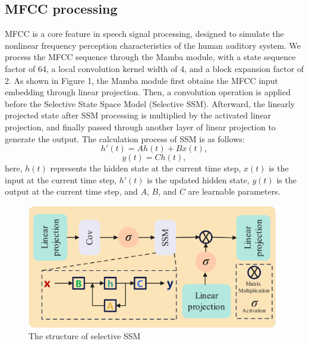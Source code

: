 \documentclass[runningheads]{llncs}
\begin{document}
\subsection{MFCC processing}

MFCC is a core feature in speech signal processing, designed to simulate the nonlinear frequency perception characteristics of the human auditory system. We process the MFCC sequence through the Mamba module, with a state sequence factor of 64, a local convolution kernel width of 4, and a block expansion factor of 2. As shown in Figure 1, the Mamba module first obtains the MFCC input embedding through linear projection. Then, a convolution operation is applied before the Selective State Space Model (Selective SSM). Afterward, the linearly projected state after SSM processing is multiplied by the activated linear projection, and finally passed through another layer of linear projection to generate the output. The calculation process of SSM is as follows:
\begin{equation}
h'(t)=Ah(t)+Bx(t), 
\end{equation}
\begin{equation}
y(t)=Ch(t), 
\end{equation}
here, \( h(t) \) represents the hidden state at the current time step, \( x(t) \) is the input at the current time step, \( h'(t) \) is the updated hidden state, \( y(t) \) is the output at the current time step, and \( A \), \( B \), and \( C \) are learnable parameters.

\begin{figure}[htbp]
\centering
\includegraphics[width=1.0\linewidth]{mamba_new.jpg}
\caption{The structure of selective SSM}
\label{figure_SSM}
\end{figure}
\end{document}
